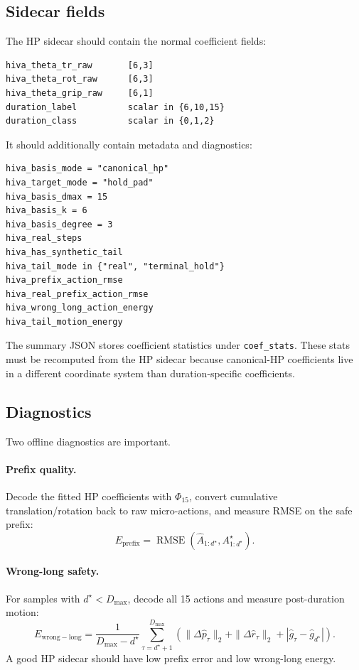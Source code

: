 \documentclass[11pt]{article}
\begin{document}
\subsection{Sidecar fields}
The HP sidecar should contain the normal coefficient fields:
\begin{lstlisting}
hiva_theta_tr_raw       [6,3]
hiva_theta_rot_raw      [6,3]
hiva_theta_grip_raw     [6,1]
duration_label          scalar in {6,10,15}
duration_class          scalar in {0,1,2}
\end{lstlisting}
It should additionally contain metadata and diagnostics:
\begin{lstlisting}
hiva_basis_mode = "canonical_hp"
hiva_target_mode = "hold_pad"
hiva_basis_dmax = 15
hiva_basis_k = 6
hiva_basis_degree = 3
hiva_real_steps
hiva_has_synthetic_tail
hiva_tail_mode in {"real", "terminal_hold"}
hiva_prefix_action_rmse
hiva_real_prefix_action_rmse
hiva_wrong_long_action_energy
hiva_tail_motion_energy
\end{lstlisting}
The summary JSON stores coefficient statistics under \texttt{coef\_stats}.  These stats must be recomputed from the HP sidecar because canonical-HP coefficients live in a different coordinate system than duration-specific coefficients.

\subsection{Diagnostics}
Two offline diagnostics are important.

\paragraph{Prefix quality.}
Decode the fitted HP coefficients with \(\Phi_{15}\), convert cumulative translation/rotation back to raw micro-actions, and measure RMSE on the safe prefix:
\begin{equation}
E_{\mathrm{prefix}}
=\operatorname{RMSE}\left(\hat A_{1:d^\star}, A^\star_{1:d^\star}\right).
\end{equation}

\paragraph{Wrong-long safety.}
For samples with \(d^\star<D_{\max}\), decode all 15 actions and measure post-duration motion:
\begin{equation}
E_{\mathrm{wrong-long}}
=\frac{1}{D_{\max}-d^\star}\sum_{\tau=d^\star+1}^{D_{\max}}
\left(\|\Delta \hat p_\tau\|_2+\|\Delta \hat r_\tau\|_2+|\hat g_\tau-\hat g_{d^\star}|\right).
\end{equation}
A good HP sidecar should have low prefix error and low wrong-long energy.
\end{document}
